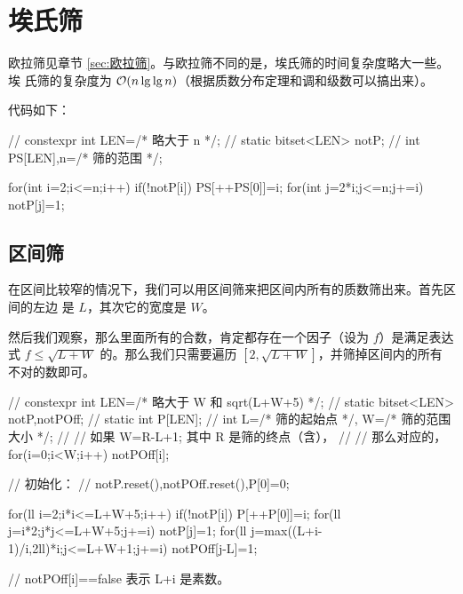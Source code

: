 \section{埃氏筛}
\label{sec:埃氏筛}



欧拉筛见章节 \ref{sec:欧拉筛}。与欧拉筛不同的是，埃氏筛的时间复杂度略大一些。埃
氏筛的复杂度为 $\mathcal{O}(n \lg \lg n)$（根据质数分布定理和调和级数可以搞出来）。

代码如下：
\begin{Cpp}
{
  // constexpr int LEN=/* 略大于 n */;
  // static bitset<LEN> notP;
  // int PS[LEN],n=/* 筛的范围 */;

  for(int i=2;i<=n;i++){
    if(!notP[i]){
      PS[++PS[0]]=i;
      for(int j=2*i;j<=n;j+=i){
        notP[j]=1;
      }
    }
  }
}
\end{Cpp}



\subsection{区间筛}
在区间比较窄的情况下，我们可以用区间筛来把区间内所有的质数筛出来。首先区间的左边
是 $L$，其次它的宽度是 $W$。

然后我们观察，那么里面所有的合数，肯定都存在一个因子（设为 $f$）是满足表达式 $f
\le \sqrt{L + W}$ 的。那么我们只需要遍历 $[2, \sqrt{L + W}]$，并筛掉区间内的所有
不对的数即可。
\begin{Cpp}
{
  // constexpr int LEN=/* 略大于 W 和 sqrt(L+W+5) */;
  // static bitset<LEN> notP,notPOff;
  // static int P[LEN];
  // int L=/* 筛的起始点 */, W=/* 筛的范围大小 */;
  // // 如果 W=R-L+1; 其中 R 是筛的终点（含），
  // // 那么对应的，for(i=0;i<W;i++) notPOff[i];

  // 初始化：
  // notP.reset(),notPOff.reset(),P[0]=0;


  for(ll i=2;i*i<=L+W+5;i++){
    if(!notP[i]){
      P[++P[0]]=i;
      for(ll j=i*2;j*j<=L+W+5;j+=i){
        notP[j]=1;
      }
      for(ll j=max((L+i-1)/i,2ll)*i;j<=L+W+1;j+=i){
        notPOff[j-L]=1;
      }
    }
  }

  // notPOff[i]==false 表示 L+i 是素数。
}
\end{Cpp}

